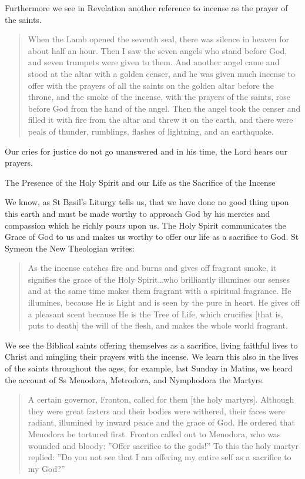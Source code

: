 \documentclass[
]{article}
\newcommand{\RL}[1]{\beginR #1\endR}
\begin{document}
Furthermore we see in Revelation another reference to incense as the
prayer of the saints.

\begin{quote}
When the Lamb opened the seventh seal, there was silence in heaven for
about half an hour. Then I saw the seven angels who stand before God,
and seven trumpets were given to them. And another angel came and stood
at the altar with a golden censer, and he was given much incense to
offer with the prayers of all the saints on the golden altar before the
throne, and the smoke of the incense, with the prayers of the saints,
rose before God from the hand of the angel. Then the angel took the
censer and filled it with fire from the altar and threw it on the earth,
and there were peals of thunder, rumblings, flashes of lightning, and an
earthquake.
\end{quote}

Our cries for justice do not go unanswered and in his time, the Lord
hears our prayers.

The Presence of the Holy Spirit and our Life as the Sacrifice of the
Incense

We know, as St Basil's Liturgy tells us, that we have done no good thing
upon this earth and must be made worthy to approach God by his mercies
and compassion which he richly pours upon us. The Holy Spirit
communicates the Grace of God to us and makes us worthy to offer our
life as a sacrifice to God. St Symeon the New Theologian writes:

\begin{quote}
As the incense catches fire and burns and gives off fragrant smoke, it
signifies the grace of the Holy Spirit\ldots who brilliantly illumines
our senses and at the same time makes them fragrant with a spiritual
fragrance. He illumines, because He is Light and is seen by the pure in
heart. He gives off a pleasant scent because He is the Tree of Life,
which crucifies {[}that is, puts to death{]} the will of the flesh, and
makes the whole world fragrant.
\end{quote}

We see the Biblical saints offering themselves as a sacrifice, living
faithful lives to Christ and mingling their prayers with the incense. We
learn this also in the lives of the saints throughout the ages, for
example, last Sunday in Matins, we heard the account of Ss Menodora,
Metrodora, and Nymphodora the Martyrs.

\begin{quote}
A certain governor, Fronton, called for them {[}the holy martyrs{]}.
Although they were great fasters and their bodies were withered, their
faces were radiant, illumined by inward peace and the grace of God. He
ordered that Menodora be tortured first. Fronton called out to Menodora,
who was wounded and bloody: \RL{''}Offer sacrifice to the gods!'' To
this the holy martyr replied: \RL{''}Do you not see that I am offering
my entire self as a sacrifice to my God?''
\end{quote}
\end{document}
